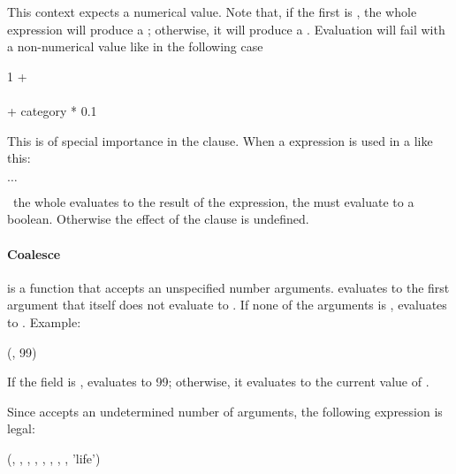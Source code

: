 This context expects a numerical value.
Note that, if the first  is ,
the whole expression will produce a ;
otherwise, it will produce a .
Evaluation will fail with a non-numerical value
like in the following case

\begin{minipage}{\textwidth}
 1 +
\\
\hspace*{2.5cm}  
  \\
\hspace*{2.5cm}  + category * 0.1 \\
\hspace*{2cm}
\end{minipage}

This is of special importance in the  clause.
When a  expression is used in a 
like this:

  $\dots$ 

\ie\ the whole  evaluates to the result
of the  expression, the 
must evaluate to a boolean. Otherwise the effect of
the  clause is undefined.

\paragraph{Coalesce}
 is a function that accepts
an unspecified number arguments.
 evaluates to
the first argument that itself
does not evaluate to .
If none of the arguments is ,
 evaluates to .
Example:

(, 99)

If the field  is ,
 evaluates to 99;
otherwise, it evaluates to the current
value of .

Since  accepts
an undetermined number of arguments,
the following expression is legal:

(,
                      ,
                      ,
                      ,
                      ,
                      ,
                      ,
                      ,
                      'life')

